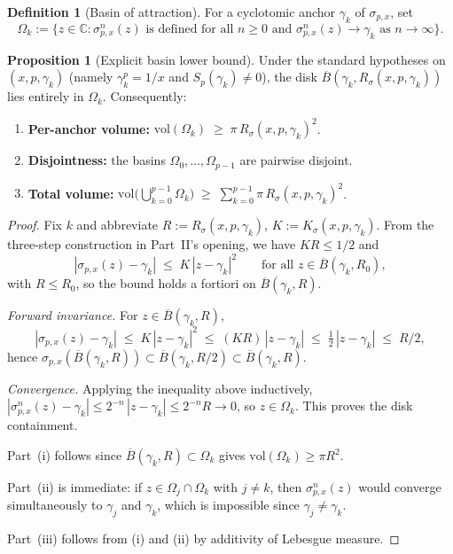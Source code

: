 \documentclass[11pt,a4paper]{article}
\theoremstyle{definition}
\newtheorem{definition}{Definition}[section]
\newtheorem{proposition}{Proposition}[section]
\begin{document}
\begin{definition}[Basin of attraction]
For a cyclotomic anchor $\gamma_k$ of $\sigma_{p,x}$, set
\[
  \Omega_k := \bigl\{ z \in \mathbb{C} :
    \sigma_{p,x}^n(z) \text{ is defined for all } n \geq 0
    \text{ and } \sigma_{p,x}^n(z) \to \gamma_k \text{ as } n \to \infty \bigr\}.
\]
\end{definition}

\begin{proposition}[Explicit basin lower bound]\label{prop:basin-lower-bound}
Under the standard hypotheses on $(x, p, \gamma_k)$ (namely $\gamma_k^p = 1/x$ and $S_p(\gamma_k) \neq 0$), the disk $\overline{B}(\gamma_k, R_\sigma(x, p, \gamma_k))$ lies entirely in $\Omega_k$. Consequently:
\begin{enumerate}
  \item[(i)] \textbf{Per-anchor volume:} $\mathrm{vol}(\Omega_k) \;\geq\; \pi\,R_\sigma(x, p, \gamma_k)^2$.
  \item[(ii)] \textbf{Disjointness:} the basins $\Omega_0, \ldots, \Omega_{p-1}$ are pairwise disjoint.
  \item[(iii)] \textbf{Total volume:} $\displaystyle \mathrm{vol}\!\bigl(\bigcup_{k=0}^{p-1}\Omega_k\bigr) \;\geq\; \sum_{k=0}^{p-1} \pi\,R_\sigma(x, p, \gamma_k)^2$.
\end{enumerate}
\end{proposition}

\begin{proof}
Fix $k$ and abbreviate $R := R_\sigma(x, p, \gamma_k)$, $K := K_\sigma(x, p, \gamma_k)$. From the three-step construction in Part~II's opening, we have $KR \leq 1/2$ and
\[
  |\sigma_{p,x}(z) - \gamma_k| \;\leq\; K\, |z - \gamma_k|^2
  \qquad \text{for all } z \in \overline{B}(\gamma_k, R_0),
\]
with $R \leq R_0$, so the bound holds a fortiori on $\overline{B}(\gamma_k, R)$.

\emph{Forward invariance.} For $z \in \overline{B}(\gamma_k, R)$,
\[
  |\sigma_{p,x}(z) - \gamma_k|
  \;\leq\; K\,|z - \gamma_k|^2
  \;\leq\; (K R)\,|z - \gamma_k|
  \;\leq\; \tfrac{1}{2}\,|z - \gamma_k|
  \;\leq\; R/2,
\]
hence $\sigma_{p,x}(\overline{B}(\gamma_k, R)) \subset \overline{B}(\gamma_k, R/2) \subset \overline{B}(\gamma_k, R)$.

\emph{Convergence.} Applying the inequality above inductively, $|\sigma_{p,x}^n(z) - \gamma_k| \leq 2^{-n}\,|z - \gamma_k| \leq 2^{-n} R \to 0$, so $z \in \Omega_k$. This proves the disk containment.

Part~(i) follows since $\overline{B}(\gamma_k, R) \subset \Omega_k$ gives $\mathrm{vol}(\Omega_k) \geq \pi R^2$.

Part~(ii) is immediate: if $z \in \Omega_j \cap \Omega_k$ with $j \neq k$, then $\sigma_{p,x}^n(z)$ would converge simultaneously to $\gamma_j$ and $\gamma_k$, which is impossible since $\gamma_j \neq \gamma_k$.

Part~(iii) follows from (i) and (ii) by additivity of Lebesgue measure.
\end{proof}
\end{document}
